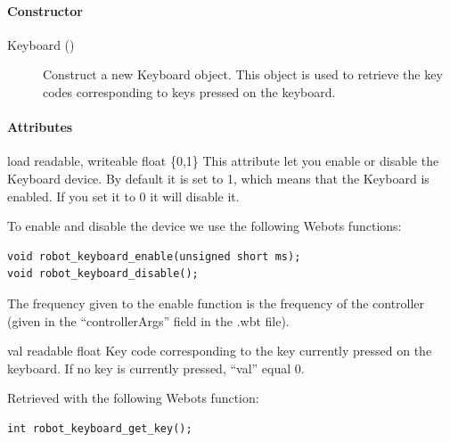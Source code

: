 \paragraph{Constructor}
\label{webots.uobjects.robotdevices.keyboard.constructor}%

\noindent
\begin{description}
\item[{Keyboard ()}]      Construct a new Keyboard object. This object is used to retrieve the
          key codes corresponding to keys pressed on the keyboard.

\end{description}

\paragraph{Attributes}
\label{webots.uobjects.robotdevices.keyboard.attributes}%

\noindent
\begin{itemize}
\begin{attribute}{load}
  {readable, writeable}
  {float}
  {\{0,1\}}
  This attribute let you enable or disable the Keyboard
  device.  By default it is set to 1, which means that the Keyboard is
  enabled. If you set it to 0 it will disable it.


          To enable and disable the device we use the following Webots functions:


\begin{lstlisting}
void robot_keyboard_enable(unsigned short ms);
void robot_keyboard_disable();
\end{lstlisting}

          The frequency given to the enable function is the frequency of the
          \urbi controller (given in the ``controllerArgs'' field in the .wbt file).
\end{attribute}

\begin{attribute}{val}
  {readable}
  {float}
  {}
  Key code corresponding to the key currently pressed on
 the keyboard. If no key is currently pressed, ``val'' equal 0.


          Retrieved with the following Webots function:


\begin{lstlisting}
int robot_keyboard_get_key();
\end{lstlisting}
\end{attribute}

\end{itemize}


